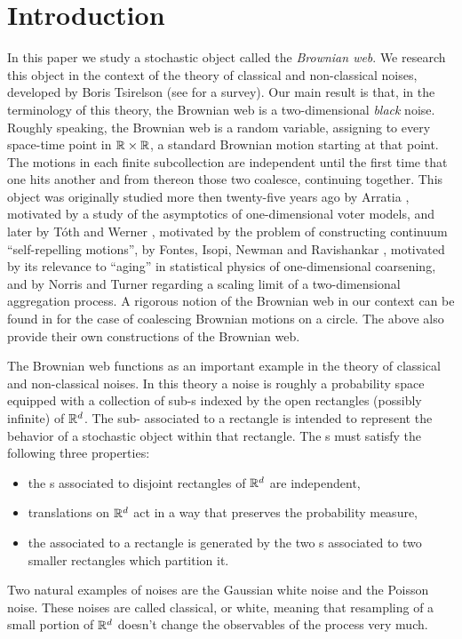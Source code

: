 {\section{Introduction}
In this paper we study a stochastic object called the \emph{Brownian web}. We
research this object in the context of the theory of classical and
non-classical noises, developed by Boris Tsirelson
(see \cite{tsirelson-nonclassical-stochastic-flows} for a survey).
Our main result
is that, in the terminology of this theory, the Brownian web is a
two-dimensional \emph{black} noise.
Roughly speaking, the Brownian web is a random variable, assigning to
every space-time point in $\mathbb{R}\times\mathbb{R}$, a standard Brownian motion starting
at that point.  The motions in each finite subcollection are independent
until the first time that one hits another
and from thereon those two coalesce, continuing together. This object was
originally studied more then twenty-five years ago by Arratia \cite{arratia}, motivated
by a study of the asymptotics of one-dimensional voter models, and later
by T\'{o}th and Werner \cite{toth-werner},
motivated by the problem of constructing continuum
``self-repelling motions'', by Fontes, Isopi, Newman and Ravishankar
\cite{fontes-et-al},
motivated by its relevance to ``aging'' in statistical physics of
one-dimensional coarsening, and by Norris and Turner
\cite{norris-turner}
regarding a scaling limit of a two-dimensional aggregation process.
A rigorous notion of the Brownian web in our context
can be found in \cite{tsirelson-lecture-course} for the case of coalescing
Brownian motions on a circle.  The above also provide
their own constructions of the Brownian web.

The Brownian web functions as an important example in the theory of
classical and non-classical noises. In this
theory a noise is roughly a probability space equipped with a collection
of sub-\sigfield{}s indexed by the open rectangles (possibly infinite) of
$\mathbb{R}^d$.  The sub-\sigfield{} associated to a rectangle is intended to
represent the behavior of a stochastic object within that rectangle.
The \sigfield{}s must satisfy the following three properties:
\begin{itemize}
\item the \sigfield{}s associated to disjoint rectangles of $\mathbb{R}^d$ are
independent,
\item translations on $\mathbb{R}^d$ act in a way that preserves the
probability measure,
\item the \sigfield{}
associated to a rectangle is generated by the two \sigfield{}s
associated to two smaller rectangles which partition it.
\end{itemize}
Two natural examples of noises are the Gaussian white noise
and the Poisson noise. These noises are called classical, or white,
meaning that
resampling of a small portion of $\mathbb{R}^d$ doesn't change the observables of the
process very much.

}
